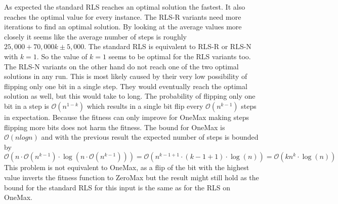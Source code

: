As expected the standard RLS reaches an optimal solution the fastest.
It also reaches the optimal value for every instance.
The RLS-R variants need more iterations to find an optimal solution.
By looking at the average values more closely it seems like the average number of steps is roughly $25,000 + 70,000k \pm 5,000$.
The standard RLS is equivalent to RLS-R or RLS-N with $k=1$.
So the value of $k=1$ seems to be optimal for the RLS variants too.
The RLS-N variants on the other hand do not reach one of the two optimal solutions in any run.
This is most likely caused by their very low possibility of flipping only one bit in a single step.
They would eventually reach the optimal solution as well, but this would take to long.
The probability of flipping only one bit in a step is $\mathcal{O}(n^{1-k})$ which results in a single bit flip every $\mathcal{O}(n^{k-1})$ steps in expectation.
Because the fitness can only improve for OneMax making steps flipping more bits does not harm the fitness.
The bound for OneMax is $\mathcal{O}(nlogn)$ and with the previous result the expected number of steps is bounded by
$\mathcal{O}(n\cdot\mathcal{O}(n^{k-1})\cdot \log(n\cdot\mathcal{O}(n^{k-1}))) 
=\mathcal{O}(n^{k-1+1}\cdot (k-1+1)\cdot\log(n))
=\mathcal{O}(kn^{k}\cdot\log(n))$
This problem is not equivalent to OneMax, as a flip of the bit with the highest value inverts the fitness function to ZeroMax but the result might still hold as the bound for the standard RLS for this input is the same as for the RLS on OneMax.